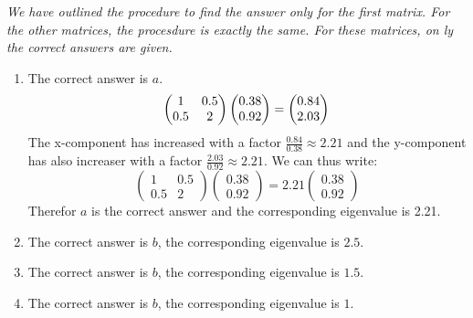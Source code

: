 \documentclass[a4paper]{report}
\begin{document}
\begin{Answer}[ref=eigen]
\textit{We have outlined the procedure to find the answer only for the first matrix. For the other matrices, the procesdure is exactly the same. For these matrices, on ly the correct answers are given.}
\begin{enumerate}
\item The correct answer is $a$.
\begin{equation*}
\begin{pmatrix} 1&0.5\\0.5&2\end{pmatrix} \begin{pmatrix}0.38\\0.92 \end{pmatrix} = \begin{pmatrix}0.84\\2.03 \end{pmatrix}\\
\end{equation*}
The x-component has increased with a factor $\frac{0.84}{0.38}\approx 2.21$ and the y-component has also increaser with a factor $\frac{2.03}{0.92}\approx 2.21$. We can thus write:
\begin{equation*}
\begin{pmatrix} 1&0.5\\0.5&2\end{pmatrix} \begin{pmatrix}0.38\\0.92 \end{pmatrix} =2.21 \begin{pmatrix}0.38\\0.92 \end{pmatrix}
\end{equation*}
Therefor $a$ is the correct answer and the corresponding eigenvalue is 2.21.
\item The correct answer is $b$, the corresponding eigenvalue is $2.5$.
\item The correct answer is $b$, the corresponding eigenvalue is $1.5$.
\item The correct answer is $b$, the corresponding eigenvalue is $1$.
\end{enumerate}
\end{Answer}
\end{document}
